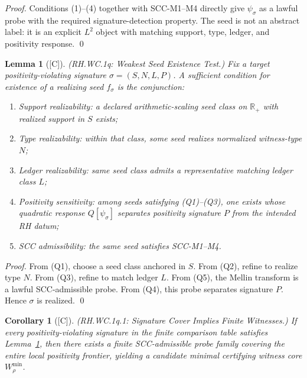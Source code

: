 \documentclass[12pt,oneside]{amsbook}
\theoremstyle{plain}
\newtheorem{lemma}[theorem]{Lemma}
\newtheorem{corollary}[theorem]{Corollary}
\theoremstyle{definition}
\theoremstyle{remark}
\newcommand{\status}[1]{\textup{[#1]}}
\begin{document}
\begin{proof}
Conditions (1)--(4) together with SCC-M1--M4 directly give
$\psi_\sigma$ as a lawful probe with the required
signature-detection property. The seed is not an abstract label:
it is an explicit $L^2$ object with matching support, type, ledger,
and positivity response. \qed
\end{proof}

\begin{lemma}[\status{C}]\label{lem:rh-wc1q}
\textup{(RH.WC.1q: Weakest Seed Existence Test.)}
Fix a target positivity-violating signature $\sigma=(S,N,L,P)$.
A sufficient condition for existence of a realizing seed $f_\sigma$
is the conjunction:
\begin{enumerate}[label=\textup{(Q\arabic*)}]
 \item \emph{Support realizability}: a declared arithmetic-scaling
 seed class on $\mathbb{R}_+$ with realized support in $S$
 exists;
 \item \emph{Type realizability}: within that class, some seed
 realizes normalized witness-type $N$;
 \item \emph{Ledger realizability}: same seed class admits a
 representative matching ledger class $L$;
 \item \emph{Positivity sensitivity}: among seeds satisfying
 (Q1)--(Q3), one exists whose quadratic response $Q[\psi_\sigma]$
 separates positivity signature $P$ from the intended RH datum;
 \item \emph{SCC admissibility}: the same seed satisfies
 SCC-M1--M4.
\end{enumerate}
\end{lemma}

\begin{proof}
From (Q1), choose a seed class anchored in $S$.
From (Q2), refine to realize type $N$.
From (Q3), refine to match ledger $L$.
From (Q5), the Mellin transform is a lawful SCC-admissible probe.
From (Q4), this probe separates signature $P$.
Hence $\sigma$ is realized. \qed
\end{proof}

\begin{corollary}[\status{C}]\label{cor:rh-wc1q-cover}
\textup{(RH.WC.1q.1: Signature Cover Implies Finite Witnesses.)}
If every positivity-violating signature in the finite comparison
table satisfies Lemma~\ref{lem:rh-wc1q}, then there exists a
finite SCC-admissible probe family covering the entire local
positivity frontier, yielding a candidate minimal certifying
witness core $W_\rho^{\min}$.
\end{corollary}
\end{document}
